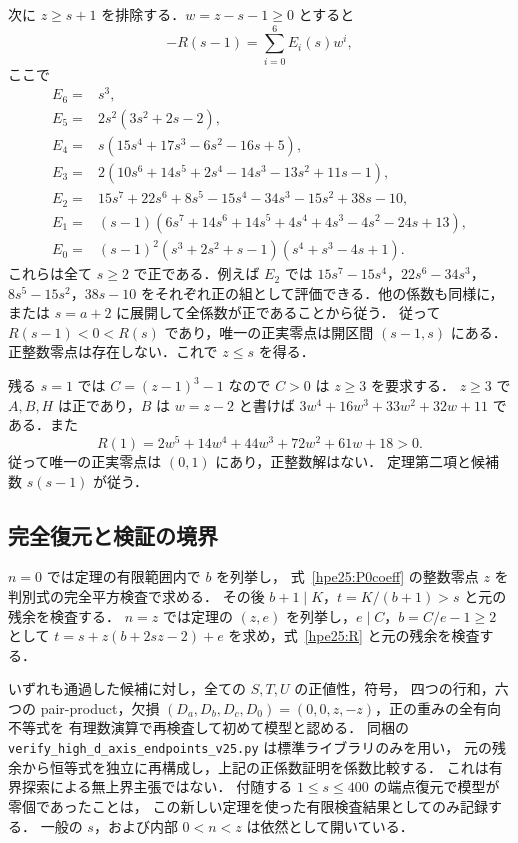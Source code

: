 次に $z\ge s+1$ を排除する．$w=z-s-1\ge0$ とすると
\begin{equation}\label{hpe25:root-gap}
 -R(s-1)=\sum_{i=0}^6 E_i(s)w^i,
\end{equation}
ここで
\begin{align*}
 E_6={}&s^3,\\
 E_5={}&2s^2(3s^2+2s-2),\\
 E_4={}&s(15s^4+17s^3-6s^2-16s+5),\\
 E_3={}&2(10s^6+14s^5+2s^4-14s^3-13s^2+11s-1),\\
 E_2={}&15s^7+22s^6+8s^5-15s^4-34s^3-15s^2+38s-10,\\
 E_1={}&(s-1)(6s^7+14s^6+14s^5+4s^4+4s^3-4s^2-24s+13),\\
 E_0={}&(s-1)^2(s^3+2s^2+s-1)(s^4+s^3-4s+1).
\end{align*}
これらは全て $s\ge2$ で正である．例えば $E_2$ では
$15s^7-15s^4$，$22s^6-34s^3$，$8s^5-15s^2$，$38s-10$
をそれぞれ正の組として評価できる．他の係数も同様に，または
$s=a+2$ に展開して全係数が正であることから従う．
従って $R(s-1)<0<R(s)$ であり，唯一の正実零点は開区間
$(s-1,s)$ にある．正整数零点は存在しない．これで $z\le s$ を得る．

残る $s=1$ では $C=(z-1)^3-1$ なので $C>0$ は $z\ge3$ を要求する．
$z\ge3$ で $A,B,H$ は正であり，$B$ は $w=z-2$ と書けば
$3w^4+16w^3+33w^2+32w+11$ である．また
\[
 R(1)=2w^5+14w^4+44w^3+72w^2+61w+18>0.
\]
従って唯一の正実零点は $(0,1)$ にあり，正整数解はない．
定理第二項と候補数 $s(s-1)$ が従う．

\subsection{完全復元と検証の境界}

$n=0$ では定理の有限範囲内で $b$ を列挙し，
式~\eqref{hpe25:P0coeff} の整数零点 $z$ を判別式の完全平方検査で求める．
その後 $b+1\mid K$，$t=K/(b+1)>s$ と元の残余を検査する．
$n=z$ では定理の $(z,e)$ を列挙し，$e\mid C$，$b=C/e-1\ge2$ として
$t=s+z(b+2sz-2)+e$ を求め，式~\eqref{hpe25:R} と元の残余を検査する．

いずれも通過した候補に対し，全ての $S,T,U$ の正値性，符号，
四つの行和，六つの pair-product，欠損
$(D_a,D_b,D_c,D_0)=(0,0,z,-z)$，正の重みの全有向不等式を
有理数演算で再検査して初めて模型と認める．
同梱の \nolinkurl{verify_high_d_axis_endpoints_v25.py} は標準ライブラリのみを用い，
元の残余から恒等式を独立に再構成し，上記の正係数証明を係数比較する．
これは有界探索による無上界主張ではない．
付随する $1\le s\le400$ の端点復元で模型が零個であったことは，
この新しい定理を使った有限検査結果としてのみ記録する．
一般の $s$，および内部 $0<n<z$ は依然として開いている．
